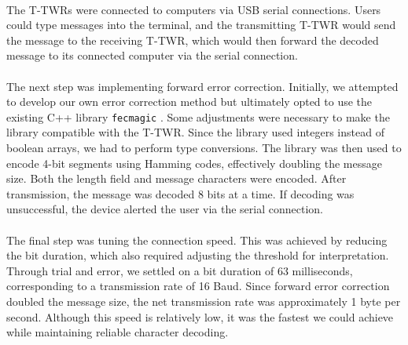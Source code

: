\\ 
The T-TWRs were connected to computers via USB serial connections. Users could type messages into the terminal, and the transmitting T-TWR would send the message to the receiving T-TWR, which would then forward the decoded message to its connected computer via the serial connection.
\\ \\
The next step was implementing forward error correction. Initially, we attempted to develop our own error correction method but ultimately opted to use the existing C++ library \texttt{fecmagic} \cite{kristof2020}. Some adjustments were necessary to make the library compatible with the T-TWR. Since the library used integers instead of boolean arrays, we had to perform type conversions. The library was then used to encode 4-bit segments using Hamming codes, effectively doubling the message size. Both the length field and message characters were encoded. After transmission, the message was decoded 8 bits at a time. If decoding was unsuccessful, the device alerted the user via the serial connection.
\\ \\
The final step was tuning the connection speed. This was achieved by reducing the bit duration, which also required adjusting the threshold for interpretation. Through trial and error, we settled on a bit duration of 63 milliseconds, corresponding to a transmission rate of 16 Baud. Since forward error correction doubled the message size, the net transmission rate was approximately 1 byte per second. Although this speed is relatively low, it was the fastest we could achieve while maintaining reliable character decoding.

